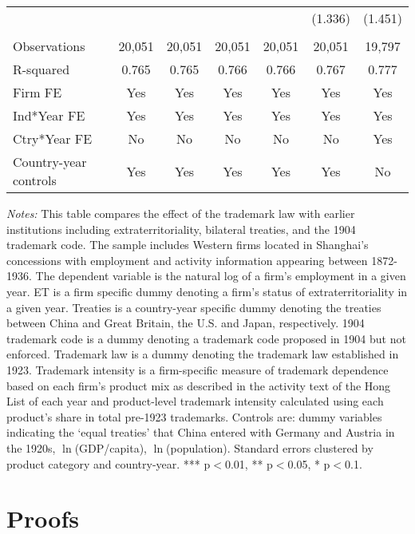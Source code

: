 \documentclass[12pt]{article}
\begin{document}
\begin{table}[hbt!]
{\begin{threeparttable}
\begin{tabular}{lcccccc}
         &  &  &  &  & (1.336) & (1.451) \\
         &  &  &  &  &  &  \\
        Observations & 20,051 & 20,051 & 20,051 & 20,051 & 20,051 & 19,797 \\
        R-squared & 0.765 & 0.765 & 0.766 & 0.766 & 0.767 & 0.777 \\
        Firm FE & Yes & Yes & Yes & Yes & Yes & Yes \\
        Ind*Year FE & Yes & Yes & Yes & Yes & Yes & Yes \\
        Ctry*Year FE & No & No & No & No & No & Yes \\
        Country-year controls & Yes & Yes & Yes & Yes & Yes & No \\ \hline \hline
    \end{tabular}
	\begin{tablenotes}[flushleft]
		\item \footnotesize \textit{Notes:} This table compares the effect of the trademark law with earlier institutions including extraterritoriality, bilateral treaties, and the 1904 trademark code. The sample includes Western firms located in Shanghai's concessions with employment and activity information appearing between 1872-1936. The dependent variable is the natural log of a firm's employment in a given year. ET is a firm specific dummy denoting a firm's status of extraterritoriality in a given year. Treaties is a country-year specific dummy denoting the treaties between China and Great Britain, the U.S. and Japan, respectively. 1904 trademark code is a dummy denoting a trademark code proposed in 1904 but not enforced. Trademark law is a dummy denoting the trademark law established in 1923. Trademark intensity is a firm-specific measure of trademark dependence based on each firm's product mix as described in the activity text of the Hong List of each year and product-level trademark intensity calculated using each product's share in total pre-1923 trademarks. Controls are: dummy variables indicating the `equal treaties' that China entered with Germany and Austria in the 1920s, $\ln$(GDP/capita), $\ln$(population). Standard errors clustered by product category and country-year. *** p$<$0.01, ** p$<$0.05, * p$<$0.1.
	\end{tablenotes}
\end{threeparttable}
}
\end{table}

\clearpage

\section{Proofs} \label{sec:proofs}
\end{document}
